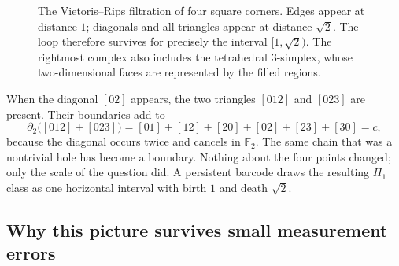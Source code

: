 \begin{figure}[H]
\centering
{}
\caption{The Vietoris--Rips filtration of four square corners. Edges appear at distance $1$; diagonals and all triangles appear at distance $\sqrt2$. The loop therefore survives for precisely the interval $[1,\sqrt2)$. The rightmost complex also includes the tetrahedral $3$-simplex, whose two-dimensional faces are represented by the filled regions.}
\end{figure}

When the diagonal $[02]$ appears, the two triangles $[012]$ and $[023]$ are present. Their boundaries add to
\[
 \partial_2\bigl([012]+[023]\bigr)
   =[01]+[12]+[20]+[02]+[23]+[30]=c,
\]
because the diagonal occurs twice and cancels in $\mathbb F_2$. The same chain that was a nontrivial hole has become a boundary. Nothing about the four points changed; only the scale of the question did. A persistent barcode draws the resulting $H_1$ class as one horizontal interval with birth $1$ and death $\sqrt2$.

\subsection*{Why this picture survives small measurement errors}


